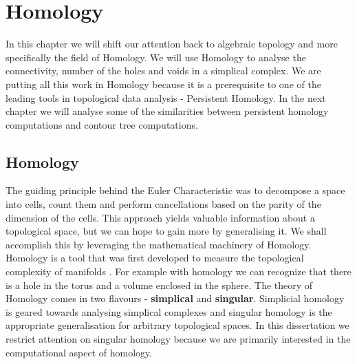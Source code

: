 \chapter{Homology}
\label{chapter5}

In this chapter we will shift our attention back to algebraic topology and more specifically the field of Homology. We will use Homology to analyse the connectivity, number of the holes and voids in a simplical complex. We are putting all this work in Homology because it is a prerequisite to one of the leading tools in topological data analysis - Persistent Homology. In the next chapter we will analyse some of the similarities between persistent homology computations and contour tree computations.

\section{Homology}



The guiding principle behind the Euler Characteristic was to decompose a space into cells, count them and perform cancellations based on the parity of the dimension of the cells. This approach yields valuable information about a topological space, but we can hope to gain more by generalising it. We shall accomplish this by leveraging the mathematical machinery of Homology. Homology is a tool that was first developed to measure the topological complexity of manifolds \cite{persistence-original}. For example with homology we can recognize that there is a hole in the torus and a volume enclosed in the sphere. The theory of Homology comes in two flavours - \textbf{simplical} and \textbf{singular}. Simplicial homology is geared towards analysing simplical complexes and singular homology is the appropriate generalisation for arbitrary topological spaces. In this dissertation we restrict attention on singular homology because we are primarily interested in the computational aspect of homology.



